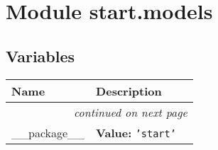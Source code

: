 %
%
%


\section{Module start.models}

    \label{start:models}


  \subsection{Variables}

    \vspace{-1cm}
\hspace{\varindent}\begin{longtable}{|p{\varnamewidth}|p{\vardescrwidth}|l}
\cline{1-2}
\cline{1-2} \centering \textbf{Name} & \centering \textbf{Description}& \\
\cline{1-2}
\endhead\cline{1-2}\multicolumn{3}{r}{\small\textit{continued on next page}}\\\endfoot\cline{1-2}
\endlastfoot\raggedright \_\-\_\-p\-a\-c\-k\-a\-g\-e\-\_\-\_\- & \raggedright \textbf{Value:} 
{\tt \texttt{'}\texttt{start}\texttt{'}}&\\
\cline{1-2}
\end{longtable}

